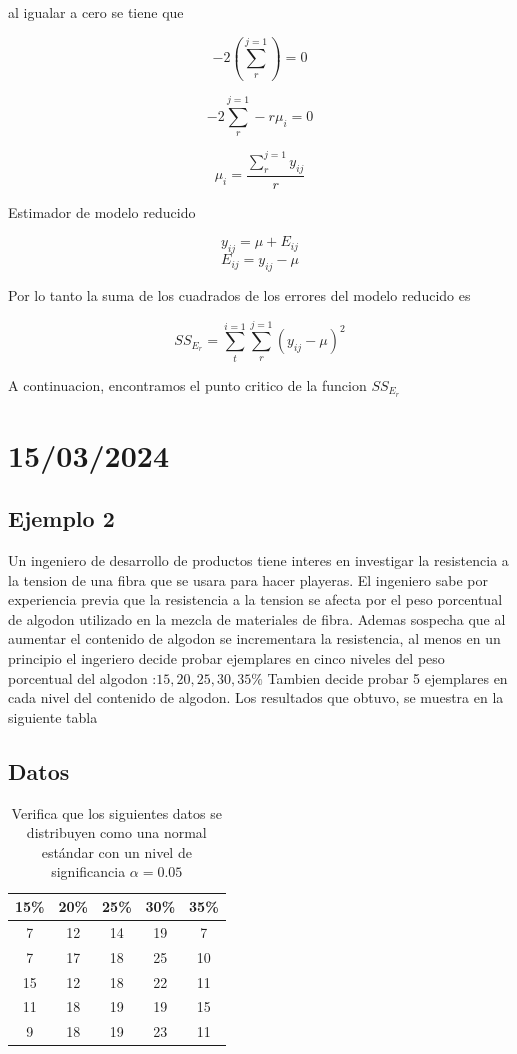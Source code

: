 \documentclass{article}
\begin{document}
al igualar a cero se tiene que

\[-2(\sum_{r}^{j=1}) = 0\]

\[-2\sum_{r}^{j=1} - r \mu_i = 0\]

\[\mu_i = \frac{\sum_{r}^{j=1} y_{ij}}{r}\]

Estimador de modelo reducido

\[ y_{ij} = \mu + E_{ij}\]
\[E_{ij} = y_{ij} - \mu\]

Por lo tanto la suma de los cuadrados de los errores del modelo reducido es

\[
    SS_{E_r} = \sum_{t}^{i=1} \sum_{r}^{j=1}(y_{ij} - \mu)^2
\]

A continuacion, encontramos el punto critico de la funcion $SS_{E_r}$

\section{15/03/2024}

\subsection*{Ejemplo 2}

Un ingeniero de desarrollo de productos tiene interes en investigar la resistencia a la tension de una fibra que se usara para hacer playeras. El ingeniero sabe por experiencia previa que la resistencia a la tension se afecta por el peso porcentual de algodon utilizado en la mezcla de materiales de fibra. Ademas sospecha que al aumentar el contenido de algodon se incrementara la resistencia, al menos en un principio el ingeriero decide probar ejemplares en cinco niveles del peso porcentual del algodon :$15,20,25,30,35 \%$ Tambien decide probar 5 ejemplares en cada nivel del contenido de algodon. Los resultados que obtuvo, se muestra en la siguiente tabla

\subsection*{Datos}
\begin{table}[ht]
    \centering
    \caption{Verifica que los siguientes datos se distribuyen como una normal estándar con un nivel de significancia $\alpha=0.05$}
    \begin{tabular}{ccccc}
        \toprule
        15\% & 20\% & 25\% & 30\% & 35\% \\
        \midrule
        7    & 12   & 14   & 19   & 7    \\
        7    & 17   & 18   & 25   & 10   \\
        15   & 12   & 18   & 22   & 11   \\
        11   & 18   & 19   & 19   & 15   \\
        9    & 18   & 19   & 23   & 11   \\
        \bottomrule
    \end{tabular}
\end{table}
\end{document}
